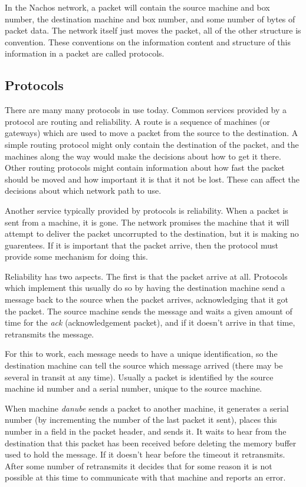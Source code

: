 In the Nachos network, a packet will contain the source machine and box number,
the destination machine and box number, and some number of bytes of packet
data.
The network itself just moves the packet, all of the other structure
is convention.  These conventions on the information content and structure
of this information in a packet are called protocols.

\subsection{Protocols}

There are many many protocols in use today.  Common services provided by
a protocol are routing and reliability.  A route is a sequence of machines
(or gateways) which are used to move a packet from the source to the
destination.  A simple routing protocol might only contain the destination
of the packet, and the machines along the way would make the decisions about
how to get it there.  Other routing protocols might contain information about
how fast the packet should be moved and how important it is that it not be
lost.  These can affect the decisions about which network path to use.

Another service typically provided by protocols is reliability.  When a
packet is sent from a machine, it is gone.  The network promises the
machine that it will attempt to deliver the packet uncorrupted to the
destination, but it is making no guarentees.  If it is important that the
packet arrive, then the protocol must provide some mechanism for
doing this.

Reliability has two aspects.  The first is that the packet arrive at all.
Protocols which implement this usually do so by having the destination machine
send a message back to the source when the packet arrives, acknowledging that
it got the packet.  The source machine sends the message and waits a given
amount of time for the {\it ack} (acknowledgement packet), and if it doesn't
arrive in that time, retransmits the message.

For this to work, each message needs to have a unique identification, so the
destination machine can tell the source which message arrived (there may
be several in transit at any time).  Usually a packet is identified by
the source machine id number and a serial number, unique to the source machine.

When machine {\it danube} sends a packet to another machine, it generates
a serial number (by incrementing the number of the last packet it sent),
places this number in a field in the packet header, and sends it.  It waits
to hear from the destination that this packet has been received before
deleting the memory buffer used to hold the message.  If it doesn't hear
before the timeout it retransmits.  After some number of retransmits it
decides that for some reason it is not possible at this time to communicate
with that machine and reports an error.

